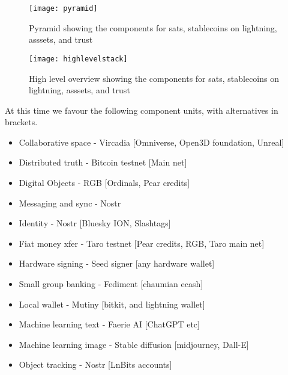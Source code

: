 \begin{figure*}[ht]\centering 	\texttt{[image: pyramid]}
	\caption{Pyramid showing the components for sats, stablecoins on lightning, asssets, and trust}
	\label{fig:pyramind}
\end{figure*}

\begin{figure*}[ht]\centering 	\texttt{[image: highlevelstack]}
	\caption{High level overview showing the components for sats, stablecoins on lightning, asssets, and trust}
	\label{fig:highlevelstack}
\end{figure*}

At this time we favour the following component units, with alternatives in brackets.
\begin{itemize}
\item Collaborative space - Vircadia [Omniverse, Open3D foundation, Unreal]
\item Distributed truth - Bitcoin testnet [Main net]
\item Digital Objects - RGB [Ordinals, Pear credits]
\item Messaging and sync - Nostr 
\item Identity - Nostr [Bluesky ION, Slashtags]
\item Fiat money xfer - Taro testnet [Pear credits, RGB, Taro main net]
\item Hardware signing - Seed signer [any hardware wallet]
\item Small group banking - Fediment [chaumian ecash]
\item Local wallet - Mutiny [bitkit, and lightning wallet]
\item Machine learning text - Faerie AI [ChatGPT etc]
\item Machine learning image - Stable diffusion [midjourney, Dall-E]
\item Object tracking - Nostr [LnBits accounts]
\end{itemize}

